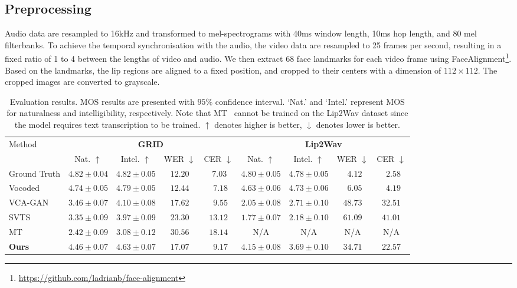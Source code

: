 \documentclass[letterpaper]{article} %
\begin{document}
\subsection{Preprocessing}
Audio data are resampled to 16kHz and transformed to mel-spectrograms with 40ms window length, 10ms hop length, and 80 mel filterbanks.
To achieve the temporal synchronisation with the audio, the video data are resampled to 25 frames per second, resulting in a fixed ratio of 1 to 4 between the lengths of video and audio.
We then extract 68 face landmarks for each video frame using FaceAlignment\footnote{\url{https://github.com/ladrianb/face-alignment}}.
Based on the landmarks, the lip regions are aligned to a fixed position, and cropped to their centers with a dimension of $112 \times 112$.
The cropped images are converted to grayscale.

\begin{table}[t]
\centering
{
\begin{tabular}{lcccccccc}
\toprule
\multirow{2}{*}{Method}     & \multicolumn{4}{c}{\bfseries GRID} & \multicolumn{4}{c}{\bfseries Lip2Wav} \\ \cmidrule(lr){2-5}\cmidrule(lr){6-9}
      & Nat. $\uparrow$   & Intel. $\uparrow$   &WER $\downarrow$ &CER $\downarrow$ & Nat. $\uparrow$  &Intel. $\uparrow$  &WER $\downarrow$  &CER $\downarrow$   \\ \cmidrule(lr){1-9}
Ground Truth    &$4.82\pm0.04$ &$4.82\pm0.05$  &$12.20$ &$~7.03$ &$4.80\pm0.05$   & $4.78\pm0.05$   &~$4.12$ &~$2.58$      \\
Vocoded &$4.74\pm0.05$       &$4.79\pm0.05$    &$12.44$ &~$7.18$ &$4.63\pm0.06$     &$4.73\pm0.06$ &~$6.05$ &~$4.19$    \\\cmidrule(lr){1-9}
VCA-GAN &$3.46\pm0.07$ &$4.10\pm0.08$ &$17.62$ &~$9.55$ &$2.05\pm0.08$ &$2.71\pm0.10$ &$48.73$ &$32.51$   \\
SVTS &$3.35\pm0.09$       &$3.97\pm0.09$ &$23.30$ &$13.12$ &$1.77\pm0.07$ & $2.18\pm0.10$   &$61.09$ &$41.01$ \\
MT &$2.42\pm0.09$  & $3.08\pm0.12$  &$30.56$ &$18.14$ &N/A &N/A   &N/A &N/A \\
\textbf{Ours}  &$\mathbf{4.46}\pm\mathbf{0.07}$ &$\mathbf{4.63}\pm\mathbf{0.07}$ &$\mathbf{17.07}$ &~$\mathbf{9.17}$ & $\mathbf{4.15}\pm\mathbf{0.08}$ &$\mathbf{3.69}\pm\mathbf{0.10}$  &$\mathbf{34.71}$ &$\mathbf{22.57}$ \\
\bottomrule
\end{tabular}
}
\caption{Evaluation results. MOS results are presented with $95\%$ confidence interval. `Nat.' and `Intel.' represent MOS for naturalness and intelligibility, respectively. Note that MT~\cite{kim2023lip} cannot be trained on the Lip2Wav dataset since the model requires text transcription to be trained. $\uparrow$ denotes higher is better, $\downarrow$ denotes lower is better.}
\label{table:compare}
\end{table}
\end{document}
